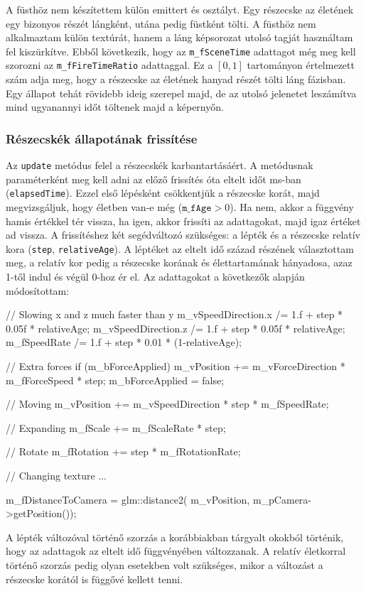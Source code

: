 A füsthöz nem készítettem külön emittert és osztályt. Egy részecske az életének egy bizonyos részét lángként, utána pedig füstként tölti. A füsthöz nem alkalmaztam külön textúrát, hanem a láng képsorozat utolsó tagját használtam fel kiszürkítve. Ebből következik, hogy az \texttt{m\_fSceneTime} adattagot még meg kell szorozni az \texttt{m\_fFireTimeRatio} adattaggal. Ez a $[0, 1]$ tartományon értelmezett szám adja meg, hogy a részecske az életének hanyad részét tölti láng fázisban. Egy állapot tehát rövidebb ideig szerepel majd, de az utolsó jelenetet leszámítva mind ugyanannyi időt töltenek majd a képernyőn. 

\subsubsection{Részecskék állapotának frissítése}
Az \texttt{update} metódus felel a részecskék karbantartásáért. A metódusnak paraméterként meg kell adni az előző frissítés óta eltelt időt ms-ban (\texttt{elapsedTime}). Ezzel első lépésként csökkentjük a részecske korát, majd megvizsgáljuk, hogy életben van-e még ($\texttt{m\_fAge} > 0$). Ha nem, akkor a függvény hamis értékkel tér vissza, ha igen, akkor frissíti az adattagokat, majd igaz értéket ad vissza. A frissítéshez két segédváltozó szükséges: a lépték és a részecske relatív kora (\texttt{step}, \texttt{relativeAge}). A léptéket az eltelt idő század részének választottam meg, a relatív kor pedig a részecske korának és élettartamának hányadosa, azaz 1-től indul és végül 0-hoz ér el. Az adattagokat a következők alapján módosítottam: 
\begin{cpp}
// Slowing x and z much faster than y
m_vSpeedDirection.x /= 1.f + step * 0.05f * relativeAge;
m_vSpeedDirection.z /= 1.f + step * 0.05f * relativeAge;
m_fSpeedRate /= 1.f + step * 0.01 * (1-relativeAge);

// Extra forces
if (m_bForceApplied)
{
	m_vPosition += m_vForceDirection * m_fForceSpeed * step;
	m_bForceApplied = false;
}

// Moving
m_vPosition += m_vSpeedDirection * step * m_fSpeedRate;

// Expanding
m_fScale += m_fScaleRate * step;

// Rotate
m_fRotation += step * m_fRotationRate;

// Changing texture
{...}

m_fDistanceToCamera = glm::distance2(
		m_vPosition, m_pCamera->getPosition());
\end{cpp}
A lépték változóval történő szorzás a korábbiakban tárgyalt okokból történik, hogy az adattagok az eltelt idő függvényében változzanak. A relatív életkorral történő szorzás pedig olyan esetekben volt szükséges, mikor a változást a részecske korától is függővé kellett tenni.

